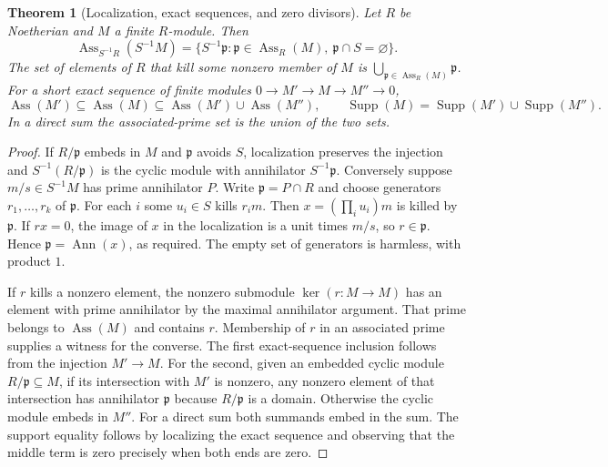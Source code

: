 \documentclass[11pt,oneside,openany]{book}
\newtheorem{theorem}{Theorem}[chapter]
\theoremstyle{definition}
\theoremstyle{remark}
\begin{document}
\begin{theorem}[Localization, exact sequences, and zero divisors]\label{p103:ALG-05-C02-S03}
Let \(R\) be Noetherian and \(M\) a finite \(R\)-module. Then
\[
 \operatorname{Ass}_{S^{-1}R}(S^{-1}M)
 =\{S^{-1}\mathfrak p:\mathfrak p\in\operatorname{Ass}_R(M),\ 
      \mathfrak p\cap S=\varnothing\}.
\]
The set of elements of \(R\) that kill some nonzero member of \(M\) is \(\bigcup_{\mathfrak p\in\operatorname{Ass}_R(M)}\mathfrak p\). For a short exact sequence of finite modules \(0\to M'\to M\to M''\to0\),
\[
 \operatorname{Ass}(M')\subseteq\operatorname{Ass}(M)
  \subseteq\operatorname{Ass}(M')\cup\operatorname{Ass}(M''),\qquad
 \operatorname{Supp}(M)=\operatorname{Supp}(M')\cup\operatorname{Supp}(M'').
\]
In a direct sum the associated-prime set is the union of the two sets.
\end{theorem}
\begin{proof}
If \(R/\mathfrak p\) embeds in \(M\) and \(\mathfrak p\) avoids \(S\), localization preserves the injection and \(S^{-1}(R/\mathfrak p)\) is the cyclic module with annihilator \(S^{-1}\mathfrak p\). Conversely suppose \(m/s\in S^{-1}M\) has prime annihilator \(P\). Write \(\mathfrak p=P\cap R\) and choose generators \(r_1,\ldots,r_k\) of \(\mathfrak p\). For each \(i\) some \(u_i\in S\) kills \(r_i m\). Then \(x=(\prod_i u_i)m\) is killed by \(\mathfrak p\). If \(r x=0\), the image of \(x\) in the localization is a unit times \(m/s\), so \(r\in\mathfrak p\). Hence \(\mathfrak p=\operatorname{Ann}(x)\), as required. The empty set of generators is harmless, with product \(1\).

If \(r\) kills a nonzero element, the nonzero submodule \(\ker(r:M\to M)\) has an element with prime annihilator by the maximal annihilator argument. That prime belongs to \(\operatorname{Ass}(M)\) and contains \(r\). Membership of \(r\) in an associated prime supplies a witness for the converse. The first exact-sequence inclusion follows from the injection \(M'\to M\). For the second, given an embedded cyclic module \(R/\mathfrak p\subseteq M\), if its intersection with \(M'\) is nonzero, any nonzero element of that intersection has annihilator \(\mathfrak p\) because \(R/\mathfrak p\) is a domain. Otherwise the cyclic module embeds in \(M''\). For a direct sum both summands embed in the sum. The support equality follows by localizing the exact sequence and observing that the middle term is zero precisely when both ends are zero.
\end{proof}
\end{document}
